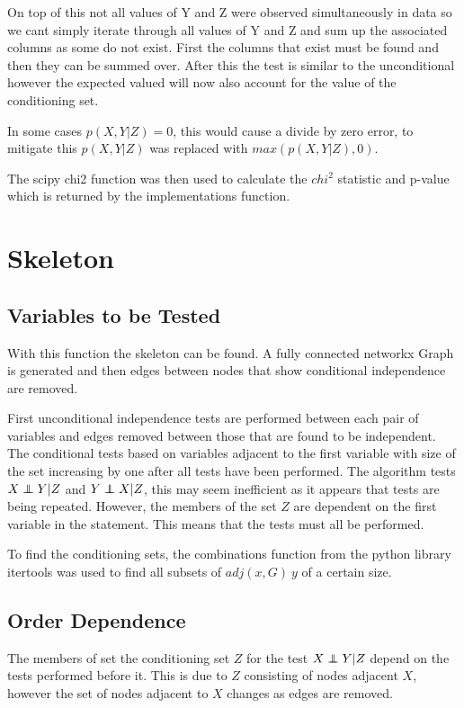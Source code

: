 \documentclass{UoYCSproject}
\newcommand\independent{\protect\mathpalette{\protect\independenT}{\perp}}
\def\independenT#1#2{\mathrel{\rlap{$#1#2$}\mkern2mu{#1#2}}}
\begin{document}
On top of this not all values of Y and Z were observed simultaneously in data so
we cant simply iterate through all values of Y and Z and sum up the associated columns as some do not exist. First the columns that exist must be found and then they can be summed over. After this the test is similar to the unconditional however the expected valued will now also account for the value of the conditioning set.

In some cases $p(X,Y|Z) = 0$, this would cause a divide by zero error, to mitigate this  $p(X,Y|Z)$ was replaced with $max(p(X,Y|Z), 0)$.

The scipy chi2 function was then used to calculate the $chi^2$ statistic and p-value which is returned by the implementations function.
\section{Skeleton}
\subsection{Variables to be Tested}
With this function the skeleton can be found. A fully connected networkx Graph is generated and then edges between nodes that show conditional independence are removed. 

First unconditional independence tests are performed between each pair of variables and edges removed between those that are found to be independent. The conditional tests based on variables adjacent to the first variable with size of the set increasing by one after all tests have been performed. The algorithm tests $X \independent Y | Z$ and $Y \independent X | Z$, this may seem inefficient as it appears that tests are being repeated. However, the members of the set $Z$ are dependent on the first variable in the statement. This means that the tests must all be performed.

To find the conditioning sets, the combinations function from the python library itertools was used to find all subsets of $adj(x,G)\ y$ of a certain size.

\subsection{Order Dependence}
The members of set the conditioning set $ Z $ for the test $X \independent Y|Z$ depend on the tests performed before it. This is due to $Z$ consisting of nodes adjacent $X$, however the set of nodes adjacent to $X$ changes as edges are removed.
\end{document}
